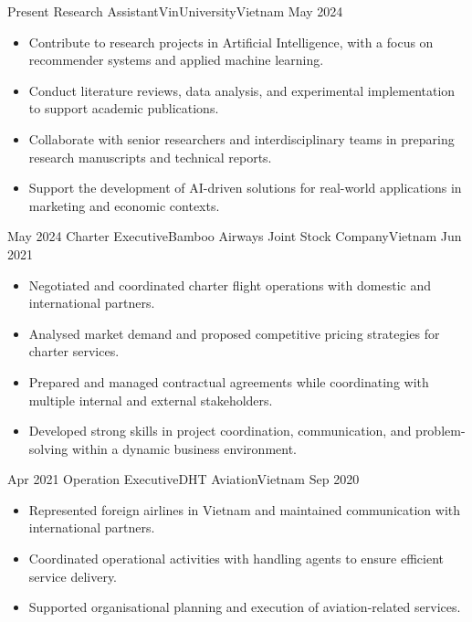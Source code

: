 
\begin{experiences}

  \experience
    {Present}
    {Research Assistant}{VinUniversity}{Vietnam}
    {May 2024}
    {
      \begin{itemize}\raggedright\sloppy
        \item Contribute to research projects in Artificial Intelligence, with a focus on recommender systems and applied machine learning.
        \item Conduct literature reviews, data analysis, and experimental implementation to support academic publications.
        \item Collaborate with senior researchers and interdisciplinary teams in preparing research manuscripts and technical reports.
        \item Support the development of AI-driven solutions for real-world applications in marketing and economic contexts.
      \end{itemize}
    }
    {}

  \emptySeparator

  \experience
    {May 2024}
    {Charter Executive}{Bamboo Airways Joint Stock Company}{Vietnam}
    {Jun 2021}
    {
      \begin{itemize}
        \item Negotiated and coordinated charter flight operations with domestic and international partners.
        \item Analysed market demand and proposed competitive pricing strategies for charter services.
        \item Prepared and managed contractual agreements while coordinating with multiple internal and external stakeholders.
        \item Developed strong skills in project coordination, communication, and problem-solving within a dynamic business environment.
      \end{itemize}
    }
    {}

  \emptySeparator

  \experience
    {Apr 2021}
    {Operation Executive}{DHT Aviation}{Vietnam}
    {Sep 2020}
    {
      \begin{itemize}
        \item Represented foreign airlines in Vietnam and maintained communication with international partners.
        \item Coordinated operational activities with handling agents to ensure efficient service delivery.
        \item Supported organisational planning and execution of aviation-related services.
      \end{itemize}
    }
    {}


\end{experiences}

